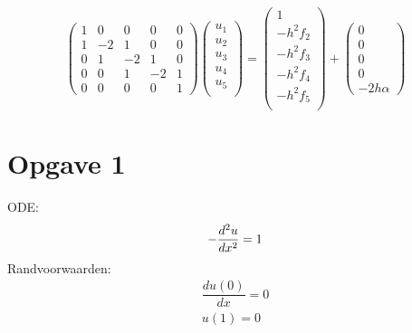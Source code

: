 \documentclass[11pt]{article}
\begin{document}
$$
\begin{pmatrix}
1 & 0 & 0 & 0 & 0 \\
1 & -2& 1 & 0 & 0 \\
0 & 1 & -2& 1 & 0 \\
0 & 0 & 1 & -2& 1 \\
0 & 0 & 0 & 0 & 1 
\end{pmatrix}
%
\begin{pmatrix}
u_{1}\\
u_{2}\\
u_{3}\\
u_{4}\\
u_{5}\\
\end{pmatrix}
=
\begin{pmatrix}
1\\
-h^2f_{2}\\
-h^2f_{3}\\
-h^2f_{4}\\
-h^2f_{5}\\
\end{pmatrix}
+
\begin{pmatrix}
0\\
0\\
0\\
0\\
-2h\alpha
\end{pmatrix}
$$


\section{Opgave 1}
ODE:\\
$$
-\dfrac{d^2u}{dx^2} = 1\\\\
$$
Randvoorwaarden:\\
\begin{align*}
	\dfrac{du(0)}{dx} = 0 \\
				 u(1) = 0
\end{align*}
\end{document}
